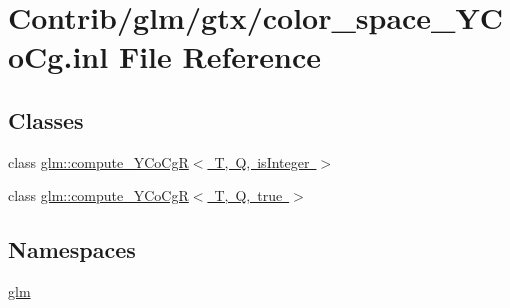 \hypertarget{color__space___y_co_cg_8inl}{}\section{Contrib/glm/gtx/color\+\_\+space\+\_\+\+Y\+Co\+Cg.inl File Reference}
\label{color__space___y_co_cg_8inl}
\subsection*{Classes}
\begin{DoxyCompactItemize}
\item 
class \mbox{\hyperlink{classglm_1_1compute___y_co_cg_r}{glm\+::compute\+\_\+\+Y\+Co\+Cg\+R$<$ T, Q, is\+Integer $>$}}
\item 
class \mbox{\hyperlink{classglm_1_1compute___y_co_cg_r_3_01_t_00_01_q_00_01true_01_4}{glm\+::compute\+\_\+\+Y\+Co\+Cg\+R$<$ T, Q, true $>$}}
\end{DoxyCompactItemize}
\subsection*{Namespaces}
\begin{DoxyCompactItemize}
\item 
 \mbox{\hyperlink{namespaceglm}{glm}}
\end{DoxyCompactItemize}
